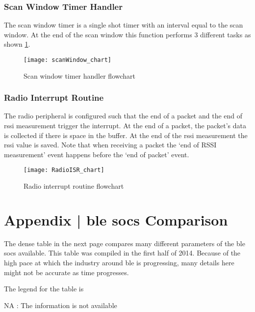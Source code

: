 \subsection{Scan Window Timer Handler}
The scan window timer is a single shot timer with an interval equal to the scan window. At the end of the scan window this function performs 3 different tasks as shown \ref{fig:scanWindow_chart}.
\begin{figure}[h]
\centering
\vspace{20pt}
\texttt{[image: scanWindow\_chart]}
\caption{Scan window timer handler flowchart}
\label{fig:scanWindow_chart}
\end{figure}
\clearpage

\subsection{Radio Interrupt Routine}
The radio peripheral is configured such that the end of a packet and the end of \acrshort{rssi} measurement trigger the interrupt. At the end of a packet, the packet's data is collected if there is space in the buffer. At the end of the \acrshort{rssi} measurement the \acrshort{rssi} value is saved. Note that when receiving a packet the `end of RSSI measurement' event happens before the `end of packet' event. 

\begin{figure}[h]
\centering
\vspace{-10pt}
\texttt{[image: RadioISR\_chart]}
\caption{Radio interrupt routine flowchart}
\label{fig:RadioISR_chart}
\vspace{-10pt}
\end{figure}

\chapter{Appendix | \texorpdfstring{\gls{ble}}{BLE} \texorpdfstring{\glspl{soc}}{SoCs} Comparison} \label{ApdxSoC}
The dense table in the next page compares many different parameters of the \gls{ble} \glspl{soc} available. This table was compiled in the first half of 2014. Because of the high pace at which the industry around \gls{ble} is progressing, many details here might not be accurate as time progresses.

The legend for the table is

\vspace{10pt}
NA \hspace{10pt}: The information is not available

